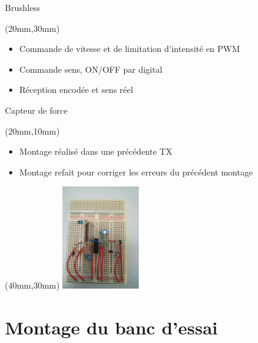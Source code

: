 \documentclass[10pt]{beamer}
\begin{document}
	\begin{frame}{Brushless}
		
		\begin{textblock*}{100mm}(20mm,30mm)
			\begin{itemize}
				\item Commande de vitesse et de limitation d'intensité en PWM
				\item Commande sens, ON/OFF par digital
				\item Réception encodée et sens réel
 			\end{itemize}
		\end{textblock*}
		
	\end{frame}

	\begin{frame}{Capteur de force}
		
		\begin{textblock*}{80mm}(20mm,10mm)
			\begin{itemize}
				\item Montage réalisé dans une précédente TX
				\item Montage refait pour corriger les erreurs du précédent montage
 			\end{itemize}
		\end{textblock*}

		\begin{textblock*}{80mm}(40mm,30mm)
				\includegraphics[width=125px]{IMG_20160629_203932.jpg}
		\end{textblock*}
		
	\end{frame}

	\section{Montage du banc d'essai}
\end{document}
